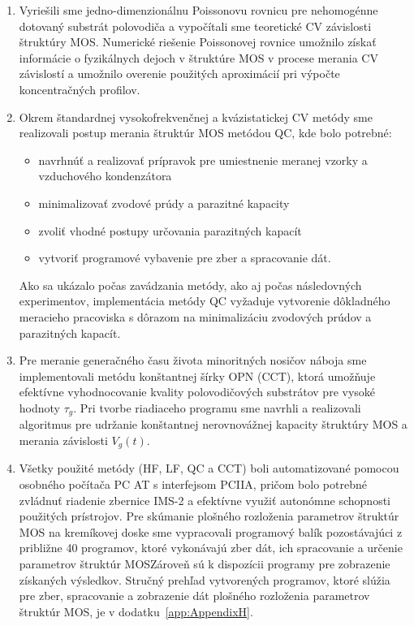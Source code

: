 \begin{enumerate}

\item Vyriešili sme jedno-dimenzionálnu Poissonovu rovnicu pre
  nehomogénne dotovaný substrát polovodiča a vypočítali sme teoretické
  CV závislosti štruktúry MOS\@. Numerické riešenie Poissonovej
  rovnice umožnilo získať informácie o fyzikálnych dejoch v štruktúre
  MOS v procese merania CV závislostí a umožnilo overenie použitých
  aproximácií pri výpočte koncentračných profilov.

\item Okrem štandardnej vysokofrekvenčnej a kvázistatickej CV metódy
  sme realizovali postup merania štruktúr MOS metódou QC, kde bolo
  potrebné:

\begin{itemize}
\item navrhnúť a realizovať prípravok pre umiestnenie meranej vzorky a
  vzduchového kondenzátora
\item  minimalizovať zvodové prúdy a parazitné kapacity
\item zvoliť vhodné postupy určovania parazitných kapacít
\item vytvoriť programové vybavenie pre zber a spracovanie dát.
\end{itemize}

Ako sa ukázalo počas zavádzania metódy, ako aj počas následovných
experimentov, implementácia metódy QC vyžaduje vytvorenie dôkladného
meracieho pracoviska s dôrazom na minimalizáciu zvodových prúdov a
parazitných kapacít.

\item Pre meranie generačného času života minoritných nosičov náboja
  sme implementovali metódu konštantnej šírky OPN (CCT), ktorá
  umožňuje efektívne vyhodnocovanie kvality polovodičových substrátov
  pre vysoké hodnoty $\tau_{g}$. Pri tvorbe riadiaceho programu sme
  navrhli a realizovali algoritmus pre udržanie konštantnej
  nerovnovážnej kapacity štruktúry MOS a merania závislosti
  $V_{g}(t)$.

\item Všetky použité metódy (HF, LF, QC a CCT) boli automatizované
  pomocou osobného počítača PC AT s interfejsom PCIIA, pričom bolo
  potrebné zvládnuť riadenie zbernice IMS-2 a efektívne využiť
  autonómne schopnosti použitých prístrojov. Pre skúmanie plošného
  rozloženia parametrov štruktúr MOS na kremíkovej doske sme
  vypracovali programový balík pozostávajúci z približne 40 programov,
  ktoré vykonávajú zber dát, ich spracovanie a určenie parametrov
  štruktúr MOS\@  Zároveň sú k dispozícii programy pre zobrazenie
  získaných výsledkov. Stručný prehľad vytvorených programov, ktoré
  slúžia pre zber, spracovanie a zobrazenie dát plošného rozloženia
  parametrov štruktúr MOS, je v dodatku~\ref{app:AppendixH}.


\end{enumerate}
